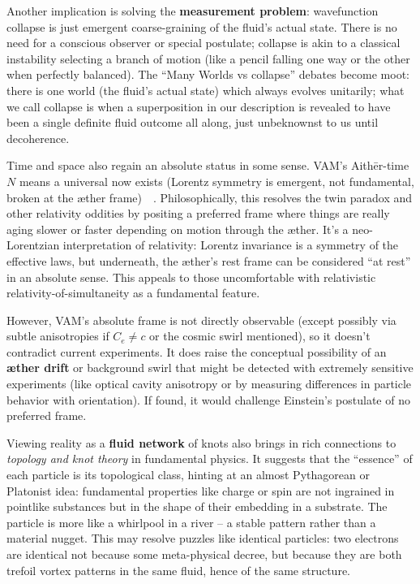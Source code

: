 \documentclass[preprint]{revtex4-2}
\begin{document}
    Another implication is solving the \textbf{measurement problem}: wavefunction collapse is just emergent coarse-graining of the fluid’s actual state. There is no need for a conscious observer or special postulate; collapse is akin to a classical instability selecting a branch of motion (like a pencil falling one way or the other when perfectly balanced). The “Many Worlds vs collapse” debates become moot: there is one world (the fluid’s actual state) which always evolves unitarily; what we call collapse is when a superposition in our description is revealed to have been a single definite fluid outcome all along, just unbeknownst to us until decoherence.

    Time and space also regain an absolute status in some sense. VAM’s Aithēr-time $N$ means a universal now exists (Lorentz symmetry is emergent, not fundamental, broken at the æther frame)~\cite{reference_234}~\cite{reference_235}. Philosophically, this resolves the twin paradox and other relativity oddities by positing a preferred frame where things are really aging slower or faster depending on motion through the æther. It’s a neo-Lorentzian interpretation of relativity: Lorentz invariance is a symmetry of the effective laws, but underneath, the æther’s rest frame can be considered “at rest” in an absolute sense. This appeals to those uncomfortable with relativistic relativity-of-simultaneity as a fundamental feature.

    However, VAM’s absolute frame is not directly observable (except possibly via subtle anisotropies if $C_e \neq c$ or the cosmic swirl mentioned), so it doesn’t contradict current experiments. It does raise the conceptual possibility of an \textbf{æther drift} or background swirl that might be detected with extremely sensitive experiments (like optical cavity anisotropy or by measuring differences in particle behavior with orientation). If found, it would challenge Einstein’s postulate of no preferred frame.

    Viewing reality as a \textbf{fluid network} of knots also brings in rich connections to \emph{topology and knot theory} in fundamental physics. It suggests that the “essence” of each particle is its topological class, hinting at an almost Pythagorean or Platonist idea: fundamental properties like charge or spin are not ingrained in pointlike substances but in the shape of their embedding in a substrate. The particle is more like a whirlpool in a river – a stable pattern rather than a material nugget. This may resolve puzzles like identical particles: two electrons are identical not because some meta-physical decree, but because they are both trefoil vortex patterns in the same fluid, hence of the same structure.
\end{document}
